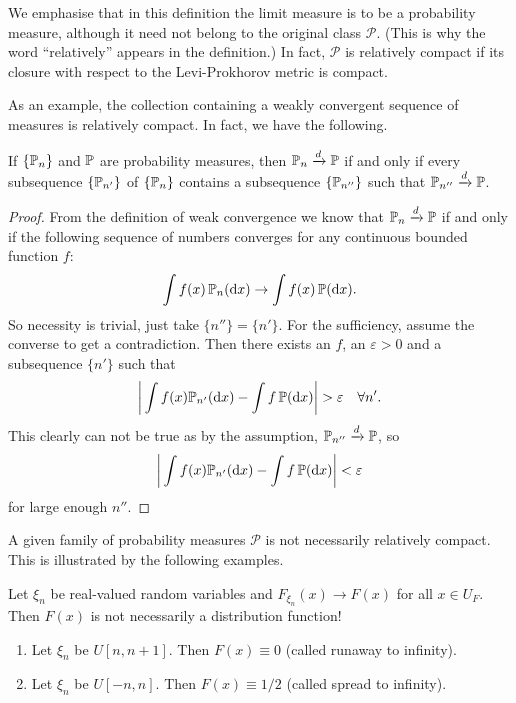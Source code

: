 \begin{remark}
We emphasise that in this definition the limit measure is to be a probability measure, although it need not belong to the original class $\mathcal{P}$. (This is why the word “relatively” appears in the definition.) In fact, $\mathcal{P}$ is relatively compact if its closure with respect to the Levi-Prokhorov metric is compact.
\end{remark}

As an example, the collection containing a weakly convergent sequence of measures is relatively compact. In fact, we have the following.
\begin{lemma} \label{lem:weak_conv_further_subsequence}
If $\{\mathbb{P}_{n}\}$ and $\mathbb{P}$ are probability measures, then $\mathbb{P}_n \xrightarrow{d} \mathbb{P}$ if and only if every subsequence $\{\mathbb{P}_{n'}\}$ of $\{\mathbb{P}_{n}\}$ contains a subsequence $\{\mathbb{P}_{n''}\}$ such that $\mathbb{P}_{n''} \xrightarrow{d}\mathbb{P}$.
\end{lemma}
\begin{proof}
From the definition of weak convergence we know that $\mathbb{P}_n \xrightarrow{d}\mathbb{P}$ if and only if the following sequence of numbers converges for any continuous bounded function $f$:
\begin{equation*}
    \int f(x) \, \mathbb{P}_n(\mathrm{d} x) \to \int f(x) \, \mathbb{P} (\mathrm{d} x).
\end{equation*}
So necessity is trivial, just take $\{n''\}=\{n'\}$. For the sufficiency, assume the converse to get a contradiction. Then there exists an $f$, an $\varepsilon>0$ and a subsequence $\{n'\}$ such that 
\begin{equation*}
    \bigg|\int f(x) \mathbb{P}_{n'}(\mathrm{d} x) - \int f \, \mathbb{P}(\mathrm{d} x) \bigg| > \varepsilon \quad \forall n'.
\end{equation*}
This clearly can not be true as by the assumption, $\mathbb{P}_{n''} \xrightarrow{d} \mathbb{P}$, so 
\begin{equation*}
    \bigg|\int f(x) \mathbb{P}_{n'}(\mathrm{d} x) - \int f \, \mathbb{P} (\mathrm{d} x) \bigg| < \varepsilon
\end{equation*}
for large enough $n''$.
\end{proof}

A given family of probability measures $\mathcal{P}$ is not necessarily relatively compact. This is illustrated by the following examples.
\begin{example} \label{ex:limits_not_a_distribution}
Let $\xi_n$ be real-valued random variables and $F_{\xi_n}(x) \to F(x)$ for all $x \in U_F$. Then $F(x)$ is not necessarily a distribution function!
\begin{enumerate}
    \item Let $\xi_n$ be $U[n, n+1]$. Then $F(x) \equiv 0$ (called runaway to infinity).
    \item Let $\xi_n$ be $U[-n, n]$. Then $F(x) \equiv 1/2$ (called spread to infinity).
\end{enumerate}
\end{example}

